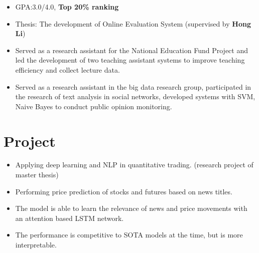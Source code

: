 \documentclass{resume_en}
\begin{document}
\begin{itemize}
    \item GPA:3.0/4.0, \textbf{Top 20\% ranking}
    \item Thesis: The development of Online Evaluation System (supervised by \textbf{Hong Li})
    \item Served as a research assistant for the National Education Fund Project and led the development of two teaching assistant systems to improve teaching efficiency and collect lecture data.
    \item Served as a research assistant in the big data research group, participated in the research of text analysis in social networks, developed systems with SVM, Naive Bayes to conduct public opinion monitoring.
\end{itemize}

\section{Project}

\begin{itemize}
    \item Applying deep learning and NLP in quantitative trading. (research project of master thesis)
    \item Performing price prediction of stocks and futures based on news titles.
    \item The model is able to learn the relevance of news and price movements with an attention based LSTM network.
    \item The performance is competitive to SOTA models at the time, but is more interpretable.
\end{itemize}
\end{document}
